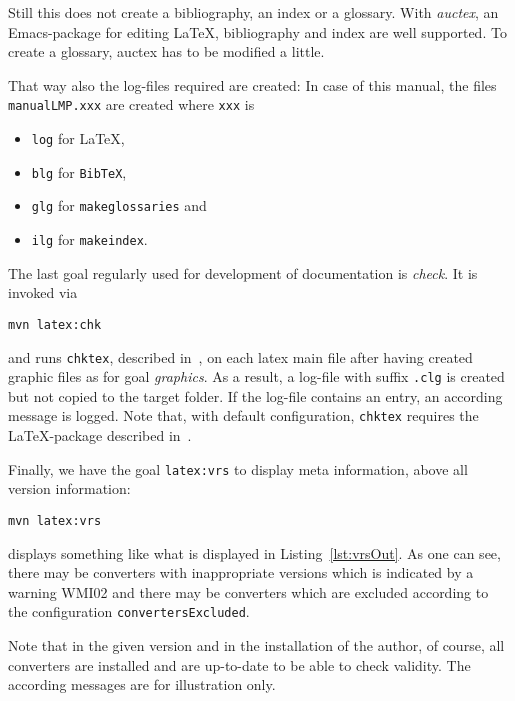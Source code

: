 Still this does not create a bibliography, an index or a glossary. 
With \emph{auctex}, an Emacs-package for editing \LaTeX, 
bibliography and index are well supported. 
To create a glossary, auctex has to be modified a little. 


That way also the log-files required are created: 
In case of this manual, 
the files \texttt{manualLMP.xxx} are created 
where \texttt{xxx} is 
%
\begin{itemize}
\item
\texttt{log} for \LaTeX, 
\item
\texttt{blg} for \texttt{BibTeX}, 
\item
\texttt{glg} for \texttt{makeglossaries} and 
\item
\texttt{ilg} for \texttt{makeindex}. 
\end{itemize}

The last goal regularly used for development of documentation is \emph{check}. 
It is invoked via 
% 
\begin{Verbatim}
mvn latex:chk
\end{Verbatim}
%
and runs \texttt{chktex}, described in~\cite{ChkTeX}, 
on each latex main file 
after having created graphic files as for goal \emph{graphics}. 
As a result, a log-file with suffix \texttt{.clg} is created 
but not copied to the target folder. 
If the log-file contains an entry, 
an according message is logged. 
Note that, with default configuration, 
\texttt{chktex} requires the \LaTeX-package  
described in~\cite{BooktP}. 


Finally, we have the goal \texttt{latex:vrs}
to display meta information, above all version information:
% 
\begin{Verbatim}
mvn latex:vrs
\end{Verbatim}
%
displays something like what is displayed in Listing~\ref{lst:vrsOut}.
As one can see, there may be converters with inappropriate versions
which is indicated by a warning WMI02 
and there may be converters which are excluded
according to the configuration \texttt{convertersExcluded}.

Note that in the given version and in the installation of the author,
of course, all converters are installed and are up-to-date
to be able to check validity.
The according messages are for illustration only. 



